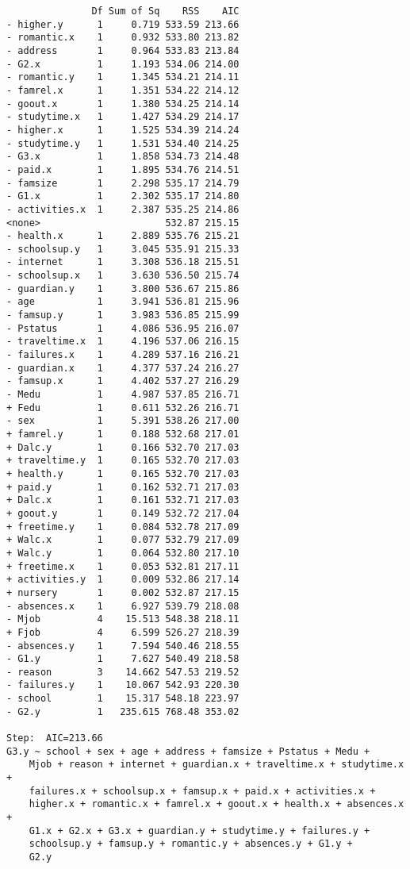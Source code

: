 \documentclass[11pt]{article}
\begin{document}
\begin{enumerate}
\begin{verbatim}
               Df Sum of Sq    RSS    AIC
- higher.y      1     0.719 533.59 213.66
- romantic.x    1     0.932 533.80 213.82
- address       1     0.964 533.83 213.84
- G2.x          1     1.193 534.06 214.00
- romantic.y    1     1.345 534.21 214.11
- famrel.x      1     1.351 534.22 214.12
- goout.x       1     1.380 534.25 214.14
- studytime.x   1     1.427 534.29 214.17
- higher.x      1     1.525 534.39 214.24
- studytime.y   1     1.531 534.40 214.25
- G3.x          1     1.858 534.73 214.48
- paid.x        1     1.895 534.76 214.51
- famsize       1     2.298 535.17 214.79
- G1.x          1     2.302 535.17 214.80
- activities.x  1     2.387 535.25 214.86
<none>                      532.87 215.15
- health.x      1     2.889 535.76 215.21
- schoolsup.y   1     3.045 535.91 215.33
- internet      1     3.308 536.18 215.51
- schoolsup.x   1     3.630 536.50 215.74
- guardian.y    1     3.800 536.67 215.86
- age           1     3.941 536.81 215.96
- famsup.y      1     3.983 536.85 215.99
- Pstatus       1     4.086 536.95 216.07
- traveltime.x  1     4.196 537.06 216.15
- failures.x    1     4.289 537.16 216.21
- guardian.x    1     4.377 537.24 216.27
- famsup.x      1     4.402 537.27 216.29
- Medu          1     4.987 537.85 216.71
+ Fedu          1     0.611 532.26 216.71
- sex           1     5.391 538.26 217.00
+ famrel.y      1     0.188 532.68 217.01
+ Dalc.y        1     0.166 532.70 217.03
+ traveltime.y  1     0.165 532.70 217.03
+ health.y      1     0.165 532.70 217.03
+ paid.y        1     0.162 532.71 217.03
+ Dalc.x        1     0.161 532.71 217.03
+ goout.y       1     0.149 532.72 217.04
+ freetime.y    1     0.084 532.78 217.09
+ Walc.x        1     0.077 532.79 217.09
+ Walc.y        1     0.064 532.80 217.10
+ freetime.x    1     0.053 532.81 217.11
+ activities.y  1     0.009 532.86 217.14
+ nursery       1     0.002 532.87 217.15
- absences.x    1     6.927 539.79 218.08
- Mjob          4    15.513 548.38 218.11
+ Fjob          4     6.599 526.27 218.39
- absences.y    1     7.594 540.46 218.55
- G1.y          1     7.627 540.49 218.58
- reason        3    14.662 547.53 219.52
- failures.y    1    10.067 542.93 220.30
- school        1    15.317 548.18 223.97
- G2.y          1   235.615 768.48 353.02

Step:  AIC=213.66
G3.y ~ school + sex + age + address + famsize + Pstatus + Medu + 
    Mjob + reason + internet + guardian.x + traveltime.x + studytime.x + 
    failures.x + schoolsup.x + famsup.x + paid.x + activities.x + 
    higher.x + romantic.x + famrel.x + goout.x + health.x + absences.x + 
    G1.x + G2.x + G3.x + guardian.y + studytime.y + failures.y + 
    schoolsup.y + famsup.y + romantic.y + absences.y + G1.y + 
    G2.y


\end{verbatim}
\end{enumerate}
\end{document}
